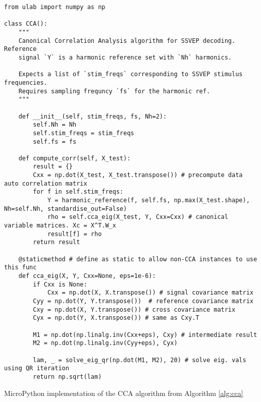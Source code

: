 \begin{listing}[h]
\footnotesize
\begin{verbatim}
from ulab import numpy as np

class CCA():
    """
    Canonical Correlation Analysis algorithm for SSVEP decoding. Reference 
    signal `Y` is a harmonic reference set with `Nh` harmonics.
    
    Expects a list of `stim_freqs` corresponding to SSVEP stimulus frequencies.
    Requires sampling frequncy `fs` for the harmonic ref.
    """
    
    def __init__(self, stim_freqs, fs, Nh=2):
        self.Nh = Nh
        self.stim_freqs = stim_freqs
        self.fs = fs
        
    def compute_corr(self, X_test):            
        result = {}
        Cxx = np.dot(X_test, X_test.transpose()) # precompute data auto correlation matrix
        for f in self.stim_freqs:
            Y = harmonic_reference(f, self.fs, np.max(X_test.shape), Nh=self.Nh, standardise_out=False)
            rho = self.cca_eig(X_test, Y, Cxx=Cxx) # canonical variable matrices. Xc = X^T.W_x
            result[f] = rho
        return result
    
    @staticmethod # define as static to allow non-CCA instances to use this func
    def cca_eig(X, Y, Cxx=None, eps=1e-6):
        if Cxx is None:
            Cxx = np.dot(X, X.transpose()) # signal covariance matrix
        Cyy = np.dot(Y, Y.transpose())  # reference covariance matrix
        Cxy = np.dot(X, Y.transpose()) # cross covariance matrix
        Cyx = np.dot(Y, X.transpose()) # same as Cxy.T

        M1 = np.dot(np.linalg.inv(Cxx+eps), Cxy) # intermediate result
        M2 = np.dot(np.linalg.inv(Cyy+eps), Cyx)

        lam, _ = solve_eig_qr(np.dot(M1, M2), 20) # solve eig. vals using QR iteration
        return np.sqrt(lam)

\end{verbatim}
\caption{MicroPython implementation of the CCA algorithm from Algorithm \ref{alg:cca}}
\label{app-listing:cca-algo}
\end{listing}

